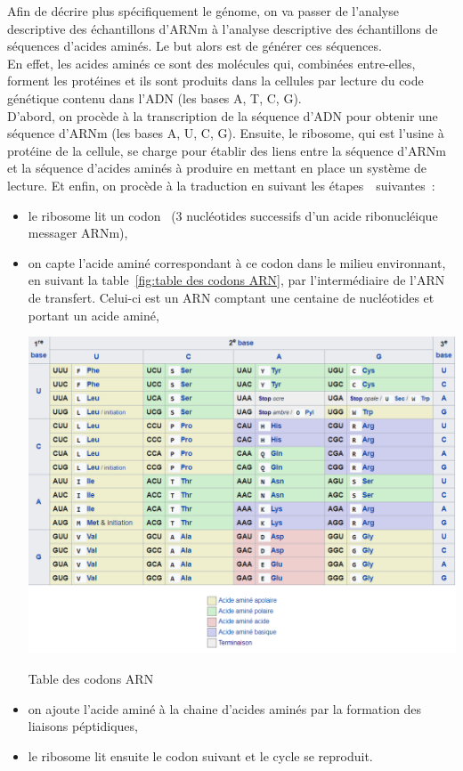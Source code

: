 \documentclass[12pt]{article}
\begin{document}
Afin de décrire plus spécifiquement le génome, on va passer de l'analyse descriptive des échantillons d'ARNm à l'analyse descriptive des échantillons de séquences d'acides aminés. Le but alors est de générer ces séquences. \\
En effet, les acides aminés ce sont des molécules qui, combinées entre-elles, forment les protéines et ils sont produits dans la cellules par lecture du code génétique contenu dans l'ADN (les bases A, T, C, G). \\
D'abord, on procède à la transcription de la séquence d'ADN pour obtenir une séquence d'ARNm (les bases A, U, C, G). Ensuite, le ribosome, qui est l'usine à protéine de la cellule, se charge pour établir des liens entre la séquence d'ARNm et la séquence d'acides aminés à produire en mettant en place un système de lecture. Et enfin, on procède à la traduction en suivant les étapes~\cite{synthpep}~suivantes~: \\


\begin{itemize}
\item  le ribosome lit un codon~\cite{codon} (3 nucléotides successifs d’un acide ribonucléique messager ARNm),
\item  on capte l'acide aminé correspondant à ce codon dans le milieu environnant, en suivant la table~\ref{fig:table des codons ARN}, par l'intermédiaire de l'ARN de transfert. Celui-ci est un ARN comptant une centaine de nucléotides et portant un acide aminé,\\

        \begin{table}[!h]
             \centering
             \includegraphics[scale = 0.8]{Images/Codons/tableau des codons ARN.png}
             \caption{Table des codons ARN}
             \label{fig:table des codons ARN}
        \end{table}

\item on ajoute l'acide aminé à la chaine d'acides aminés par la formation des liaisons péptidiques,
\item le ribosome lit ensuite le codon suivant et le cycle se reproduit.
\end{itemize}
\end{document}
